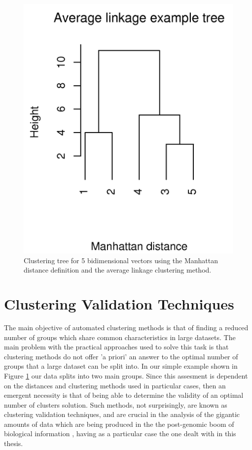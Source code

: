 \begin{figure}[t]
\centering
\includegraphics[scale=0.3]{Appendix/appendixtree.png}
\caption{Clustering  tree  for   5  bidimensional  vectors  using  the
  Manhattan  distance definition  and the  average  linkage clustering
  method.}
\label{fig:tree}
\end{figure}

\section{Clustering Validation Techniques}
The main objective of automated  clustering methods is that of finding
a reduced number of groups which share common characteristics in large
datasets. The main problem with the practical approaches used to solve
this task is that clustering methods do not offer 'a priori' an answer
to the  optimal number  of groups  that a large  dataset can  be split
into. In  our simple example  shown in Figure \ref{fig:tree}  our data
splits into two main groups.  Since this assesment is dependent on the
distances  and clustering methods  used in  particular cases,  then an
emergent necessity is that of  being able to determine the validity of
an   optimal  number   of  clusters   solution.   Such   methods,  not
surprisingly, are  known as clustering validation  techniques, and are
crucial  in the analysis  of the  gigantic amounts  of data  which are
being produced in the  the post-genomic boom of biological information
\cite{handl2005}, having  as a particular  case the one dealt  with in
this thesis.

